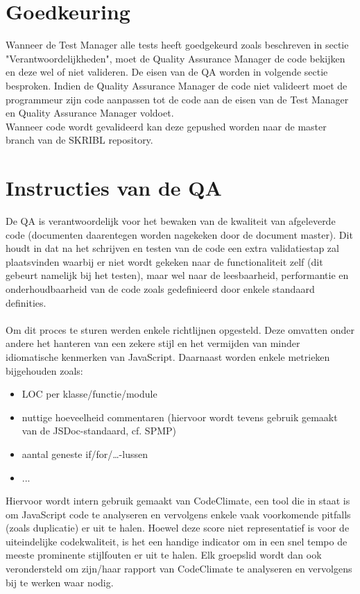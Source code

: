 \documentclass{article}
\begin{document}
\section{Goedkeuring}
Wanneer de Test Manager alle tests heeft goedgekeurd zoals beschreven in sectie "Verantwoordelijkheden", moet de Quality Assurance Manager de code bekijken en deze wel of niet valideren. De eisen van de QA worden in volgende sectie besproken. Indien de Quality Assurance Manager de code niet valideert moet de programmeur zijn code aanpassen tot de code aan de eisen van de Test Manager en Quality Assurance Manager voldoet. 
\\
Wanneer code wordt gevalideerd kan deze gepushed worden naar de master branch van de SKRIBL repository.
%
\section{Instructies van de QA}
De QA is verantwoordelijk voor het bewaken van de kwaliteit van afgeleverde code (documenten daarentegen worden nagekeken door de document master). Dit houdt in dat na het schrijven en testen van de code een extra validatiestap zal plaatsvinden waarbij er niet wordt gekeken naar de functionaliteit zelf (dit gebeurt namelijk bij het testen), maar wel naar de leesbaarheid, performantie en onderhoudbaarheid van de code zoals gedefinieerd door enkele standaard definities. 
\\\\
Om dit proces te sturen werden enkele richtlijnen opgesteld. Deze omvatten onder andere het hanteren van een zekere stijl en het vermijden van minder idiomatische kenmerken van JavaScript. Daarnaast worden enkele metrieken bijgehouden zoals:\\
\begin{itemize}
\item LOC per klasse/functie/module
\item nuttige hoeveelheid commentaren (hiervoor wordt tevens gebruik gemaakt van de JSDoc-standaard, cf. SPMP)
\item aantal geneste if/for/…-lussen
\item ...
\end{itemize}
Hiervoor wordt intern gebruik gemaakt van CodeClimate, een tool die in staat is om JavaScript code te analyseren en vervolgens enkele vaak voorkomende pitfalls (zoals duplicatie) er uit te halen. Hoewel deze score niet representatief is voor de uiteindelijke codekwaliteit, is het een handige indicator om in een snel tempo de meeste prominente stijlfouten er uit te halen. Elk groepslid wordt dan ook verondersteld om zijn/haar rapport van CodeClimate te analyseren en vervolgens bij te werken waar nodig.
\end{document}
